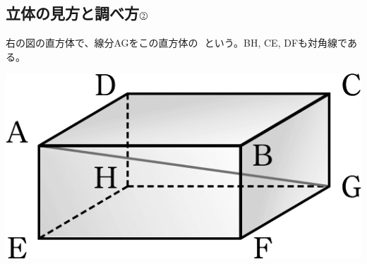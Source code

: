 \documentclass[
  12pt,a4paper,lualatex,ja=standard]{bxjsarticle}
\begin{document}
\newcommand{\myarc}[1]{
   \tikz [baseline = (N.base), every node/.style={}] {
      \node [inner sep = 0pt] (N) {$\mathrm{#1}$};
      \draw [line width = 0.4pt] plot [smooth, tension=1.3] coordinates {
         ($(N.north west) + (0.1ex,0)$)
         ($(N.north)      + (0,0.5ex)$)
         ($(N.north east) + (0,0)$)
      };
   }
}

\makeatletter
\newenvironment{figurehere}{\def\@captype{figure}}{}
\makeatother

\newcommand{\goku}[1]{\, \fbox{\phantom{\text{#1}} \quad} \,}

\hypertarget{ux7acbux4f53ux306eux898bux65b9ux3068ux8abfux3079ux65b9raise-0.2exhboxtextcircledscriptsize2}{%
\subsection{\texorpdfstring{立体の見方と調べ方\(\raise 0.2ex\hbox{\textcircled{\scriptsize{2}}}\)}{立体の見方と調べ方\textbackslash raise 0.2ex\textbackslash hbox\{\textbackslash textcircled\{\textbackslash scriptsize\{2\}\}\}}}\label{ux7acbux4f53ux306eux898bux65b9ux3068ux8abfux3079ux65b9raise-0.2exhboxtextcircledscriptsize2}}

\begin{multicols}{2}
右の図の直方体で、線分AGをこの直方体の\,  \,という。BH, CE, DFも対角線である。

\columnbreak

\begin{center}
\def\@captype{figure}
\includegraphics{media/image35.png}

\end{center}
\end{multicols}
\end{document}
